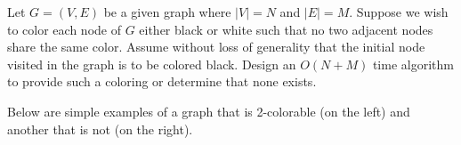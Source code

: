 Let $G=(V,E)$ be a given graph where $|V|=N$ and $|E|=M$.  
Suppose we wish to color each node of
$G$ either black or white such that no two adjacent nodes share the same color.
Assume without loss of generality that the initial node visited in the graph
is to be colored black.
Design an $O(N+M)$ time algorithm to provide such a coloring or determine
that none exists.

Below are simple examples of a graph that is 2-colorable (on the left) 
and another that is not (on the right).


\vspace{4mm}
\par
\begin{figure}[h]
\centerline{}\end{figure}

\par
\vspace{4mm}


